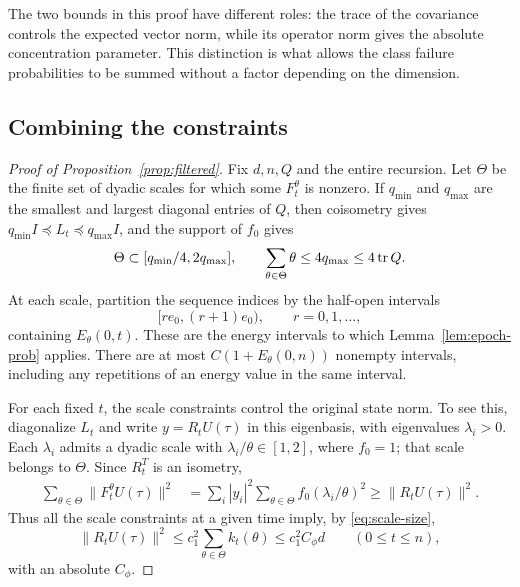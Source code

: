 The two bounds in this proof have different roles: the trace of the
covariance controls the expected vector norm, while its operator norm
gives the absolute concentration parameter.  This distinction is what
allows the class failure probabilities to be summed without a factor
depending on the dimension.

\subsection{Combining the constraints}

\begin{proof}[Proof of Proposition~\ref{prop:filtered}]
Fix $d,n,Q$ and the entire recursion.  Let $\Theta$ be the finite set of
dyadic scales for which some $F_t^\theta$ is nonzero.  If $q_{\min}$ and
$q_{\max}$ are the smallest and largest diagonal entries of $Q$, then
coisometry gives $q_{\min}I\preceq L_t\preceq q_{\max}I$, and the
support of $f_0$ gives
\begin{equation}\label{eq:used-scales}
 \Theta\subset[q_{\min}/4,2q_{\max}],
 \qquad \sum_{\theta\in\Theta}\theta\le4q_{\max}\le4\operatorname{tr} Q.
\end{equation}
At each scale, partition the sequence indices by the half-open intervals
\[
 [r e_0,(r+1)e_0),\qquad r=0,1,\ldots,
\]
containing $E_\theta(0,t)$.  These are the energy intervals to which
Lemma~\ref{lem:epoch-prob} applies.  There are at most
$C(1+E_\theta(0,n))$ nonempty intervals, including any repetitions of
an energy value in the same interval.

For each fixed $t$, the scale constraints control the original state
norm.  To see this, diagonalize $L_t$ and write $y=R_tU(\tau)$ in this
eigenbasis, with eigenvalues $\lambda_i>0$.  Each $\lambda_i$ admits a
dyadic scale with $\lambda_i/\theta\in[1,2]$, where $f_0=1$; that scale
belongs to $\Theta$.  Since $R_t^T$ is an isometry,
\begin{align}
 \sum_{\theta\in\Theta}\lVert F_t^\theta U(\tau)\rVert^2
 &=\sum_i |y_i|^2\sum_{\theta\in\Theta}
                   f_0(\lambda_i/\theta)^2
 \ge\lVert R_tU(\tau)\rVert^2.\label{eq:spectral-reconstruction}
\end{align}
Thus all the scale constraints at a given time imply, by
\eqref{eq:scale-size},
\begin{equation}\label{eq:state-survival-bound}
 \lVert R_tU(\tau)\rVert^2
 \le c_1^2\sum_{\theta\in\Theta}k_t(\theta)
 \le c_1^2 C_\phi d
 \qquad(0\le t\le n),
\end{equation}
with an absolute $C_\phi$.


\end{proof}
